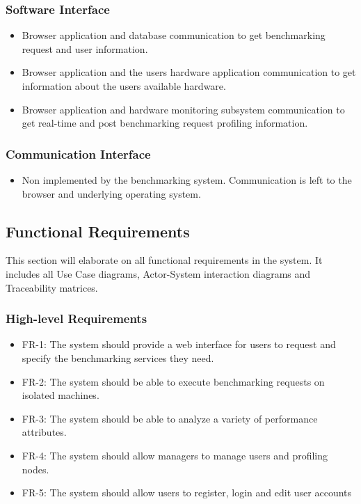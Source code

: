 \documentclass{article}
\begin{document}
        \subsubsection{Software Interface}
        	\begin{itemize}
            	\item Browser application and database communication to get benchmarking request and user information. 
                \item Browser application and the users hardware application communication to get information about the users available hardware. 
                \item Browser application and hardware monitoring subsystem communication to get real-time and post benchmarking request profiling information. 
            \end{itemize}
        \subsubsection{Communication Interface}
        	\begin{itemize}
            	\item Non implemented by the benchmarking system. Communication is left to the browser and underlying operating system.
            \end{itemize}
    
	\subsection{Functional Requirements}
	This section will elaborate on all functional requirements in the system. It includes all Use Case diagrams, Actor-System interaction diagrams and Traceability matrices.	
	
    \subsubsection{High-level Requirements}
    	\begin{itemize}
        		\item FR-1: The system should provide a web interface for users to request and specify the benchmarking services they need.
                \item FR-2: The system should be able to execute benchmarking requests on isolated machines.
                \item FR-3: The system should be able to analyze a variety of performance attributes. 
                \item FR-4: The system should allow managers to manage users and profiling nodes. 
                \item FR-5: The system should allow users to register, login and edit user accounts  
        \end{itemize}
            
\end{document}
